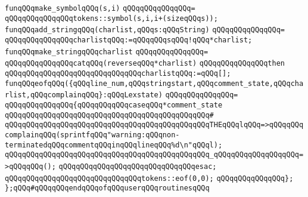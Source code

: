 \newline
\verb|funqQQqmake_symbolqQQq(s,i)|\newline
\verb|qQQqqQQqqQQqqQQq=|\newline
\verb|qQQqqQQqqQQqqQQqtokens::symbol(s,i,i+(sizeqQQqs));|\newline
\newline
\newline
\verb|funqQQqadd_stringqQQq(charlist,qQQqs:qQQqString)|\newline
\verb|qQQqqQQqqQQqqQQq=|\newline
\verb|qQQqqQQqqQQqqQQqcharlistqQQq:=qQQqqQQqsqQQq!qQQq*charlist;|\newline
\newline
\newline
\verb|funqQQqmake_stringqQQqcharlist|\newline
\verb|qQQqqQQqqQQqqQQq=|\newline
\verb|qQQqqQQqqQQqqQQqcatqQQq(reverseqQQq*charlist)|\newline
\verb|qQQqqQQqqQQqqQQqthen|\newline
\verb|qQQqqQQqqQQqqQQqqQQqqQQqqQQqqQQqcharlistqQQq:=qQQq[];|\newline
\newline
\newline
\verb|funqQQqeofqQQq({qQQqline_num,qQQqstringstart,qQQqcomment_state,qQQqcharlist,qQQqcomplainqQQq}:qQQqLexstate)|\newline
\verb|qQQqqQQqqQQqqQQq=|\newline
\verb|qQQqqQQqqQQqqQQq{qQQqqQQqqQQqcaseqQQq*comment_state|\newline
\verb|qQQqqQQqqQQqqQQqqQQqqQQqqQQqqQQqqQQqqQQqqQQqqQQq#|\newline
\verb|qQQqqQQqqQQqqQQqqQQqqQQqqQQqqQQqqQQqqQQqqQQqqQQqTHEqQQqlqQQq=>qQQqqQQqcomplainqQQq(sprintfqQQq"warning:qQQqnon-terminatedqQQqcommentqQQqinqQQqlineqQQq%d\n"qQQql);|\newline
\verb|qQQqqQQqqQQqqQQqqQQqqQQqqQQqqQQqqQQqqQQqqQQqqQQq_qQQqqQQqqQQqqQQqqQQq=>qQQqqQQq();|\newline
\verb|qQQqqQQqqQQqqQQqqQQqqQQqqQQqqQQqesac;|\newline
\newline
\verb|qQQqqQQqqQQqqQQqqQQqqQQqqQQqqQQqtokens::eof(0,0);|\newline
\verb|qQQqqQQqqQQqqQQq};|\newline
\newline
\newline
\verb|};qQQq#qQQqqQQqendqQQqofqQQquserqQQqroutinesqQQq|\newline
